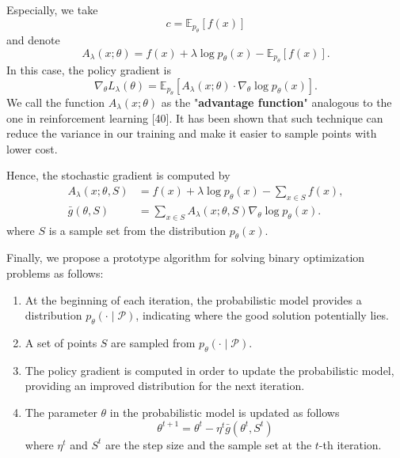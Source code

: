 Especially, we take %
\begin{equation}
    c=\mathbb{E}_{p_{\theta}}[f(x)]
\end{equation}
and denote 
\begin{equation}
    A_{\lambda}(x ; \theta)=f(x)+\lambda \log p_{\theta}(x)- \mathbb{E}_{p_{\theta}}[f(x)].
\end{equation}
In this case, the policy gradient is 
\begin{equation}
    \nabla_\theta L_\lambda(\theta)=\mathbb{E}_{p_\theta}\left[ A_{\lambda}(x ; \theta) \cdot \nabla_\theta \log p_\theta(x)\right].
\end{equation}
We call the function $A_{\lambda}(x ; \theta)$ as the "\textbf{advantage function}" analogous to the one in reinforcement learning [40]. It has been shown that such technique can reduce the variance in our training and make it easier to sample points with lower cost. 

Hence, the stochastic gradient is computed by
\begin{equation}
\begin{aligned}
A_{\lambda}(x ; \theta, S) & =f(x)+\lambda \log p_{\theta}(x)-\sum_{x \in S} f(x), \\
\bar{g}(\theta, S) & =\sum_{x \in S} A_{\lambda}(x ; \theta, S) \nabla_{\theta} \log p_{\theta}(x).
\end{aligned}
\end{equation}
where $S$ is a sample set from the distribution $p_{\theta}(x)$.

Finally, we propose a prototype algorithm for solving binary optimization problems as follows:

\begin{enumerate}
    \item At the beginning of each iteration, the probabilistic model provides a distribution $p_{\theta}(\cdot \mid \mathcal{P})$, indicating where the good solution potentially lies.
    \item A set of points $S$ are sampled from $p_{\theta}(\cdot \mid \mathcal{P})$.
    \item The policy gradient is computed in order to update the probabilistic model, providing an improved distribution for the next iteration.
    \item The parameter $\theta$ in the probabilistic model is updated as follows
  \begin{equation}
    \theta^{t+1}=\theta^{t}-\eta^{t} \bar{g}\left(\theta^{t}, S^{t}\right)
\end{equation}
  where $\eta^{t}$ and $S^{t}$ are the step size and the sample set at the $t$-th iteration.
\end{enumerate}

